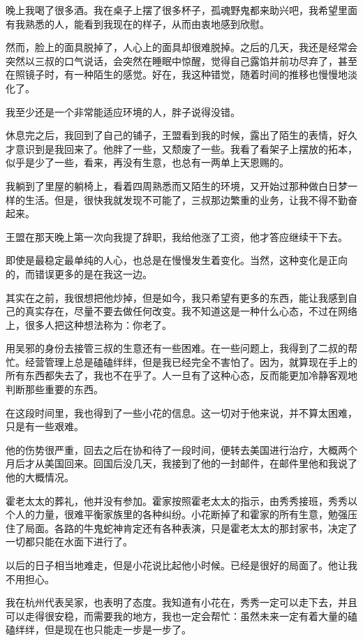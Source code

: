晚上我喝了很多酒。我在桌子上摆了很多杯子，孤魂野鬼都来助兴吧，我希望里面有我熟悉的人，能看到我现在的样子，从而由衷地感到欣慰。

然而，脸上的面具脱掉了，人心上的面具却很难脱掉。之后的几天，我还是经常会突然以三叔的口气说话，会突然在睡眠中惊醒，觉得自己露馅并前功尽弃了，甚至在照镜子时，有一种陌生的感觉。好在，我这种错觉，随着时间的推移也慢慢地淡化了。

我至少还是一个非常能适应环境的人，胖子说得没错。

休息完之后，我回到了自己的铺子，王盟看到我的时候，露出了陌生的表情，好久才意识到是我回来了。他胖了一些，又颓废了一些。我看了看架子上摆放的拓本，似乎是少了一些，看来，再没有生意，也总有一两单上天恩赐的。

我躺到了里屋的躺椅上，看着四周熟悉而又陌生的环境，又开始过那种做白日梦一样的生活。但是，很快我就发现不可能了，三叔那边繁重的业务，让我不得不勤奋起来。

王盟在那天晚上第一次向我提了辞职，我给他涨了工资，他才答应继续干下去。

即使是最稳定最单纯的人心，也总是在慢慢发生着变化。当然，这种变化是正向的，而错误更多的是在我这一边。

其实在之前，我很想把他炒掉，但是如今，我只希望有更多的东西，能让我感到自己的真实存在，尽量不要去做任何改变。我不知道这是一种什么心态，不过在网络上，很多人把这种想法称为：你老了。

用吴邪的身份去接管三叔的生意还有一些困难。在一些问题上，我得到了二叔的帮忙。经营管理上总是磕磕绊绊，但是我已经完全不害怕了。因为，就算现在手上的所有东西都失去了，我也不在乎了。人一旦有了这种心态，反而能更加冷静客观地判断那些重要的东西。

在这段时间里，我也得到了一些小花的信息。这一切对于他来说，并不算太困难，只是有一些艰难。

他的伤势很严重，回去之后在协和待了一段时间，便转去美国进行治疗，大概两个月后才从美国回来。回国后没几天，我接到了他的一封邮件，在邮件里他和我说了他的大概情况。

霍老太太的葬礼，他并没有参加。霍家按照霍老太太的指示，由秀秀接班，秀秀以个人的力量，很难平衡家族里的各种纠纷。小花断掉了和霍家的所有生意，勉强压住了局面。各路的牛鬼蛇神肯定还有各种表演，只是霍老太太的那封家书，决定了一切都只能在水面下进行了。

以后的日子相当地难走，但是小花说比起他小时候。已经是很好的局面了。他让我不用担心。

我在杭州代表吴家，也表明了态度。我知道有小花在，秀秀一定可以走下去，并且可以走得很安稳，而需要我的地方，我也一定会帮忙：虽然未来一定有着大量的磕磕绊绊，但是现在也只能走一步是一步了。

